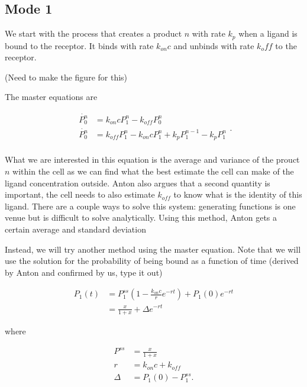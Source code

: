 \subsection{\label{sec:mode1}Mode 1}

We start with the process that creates a product $n$ with rate $k_p$ when a ligand is bound to the receptor. It binds with rate $k_{on}c$ and unbinds with rate $k_off$ to the receptor.

(Need to make the figure for this)

The master equations are

\begin{equation}
\begin{aligned}
 \dot{P_0^n} &= k_{on}cP_1^n -k_{off}P_0^n \\
 \dot{P_0^n} &= k_{off}P_1^n -k_{on}cP_1^n + k_pP_1^{n-1} - k_pP_1^{n}\\
\end{aligned}.
\end{equation}

What we are interested in this equation is the average and variance of the prouct $n$ within the cell as we can find what the best estimate the cell can make of the ligand concentration outside. Anton also argues that a second quantity is important, the cell needs to also estimate $k_{off}$ to know what is the identity of this ligand. There are a couple ways to solve this system: generating functions is one venue but is difficult to solve analytically. Using this method, Anton gets a certain average and standard deviation

Instead, we will try another method using the master equation. Note that we will use the solution for the probability of being bound as a function of time (derived by Anton and confirmed by us, type it out)

\begin{equation}
\begin{aligned}
P_1(t) & =  P_1^{ss}(1-\frac{k_{on}c}{r}e^{-rt}) + P_1(0)e^{-rt}\\
	   & = \frac{x}{1+x} + \Delta e^{-rt}
\end{aligned}
\end{equation}

where

\begin{equation*}
\begin{aligned}
P^{ss} & = \frac{x}{1+x}\\
r & = k_{on}c + k_{off}\\
\Delta & = P_1(0) - P_1^{ss}.
\end{aligned}
\end{equation*}


